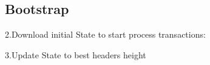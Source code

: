 \documentclass[]{report}   %
\begin{document}
\subsection{Bootstrap}



2.Download initial State to start process transactions:


3.Update State to best headers height

\end{document}
